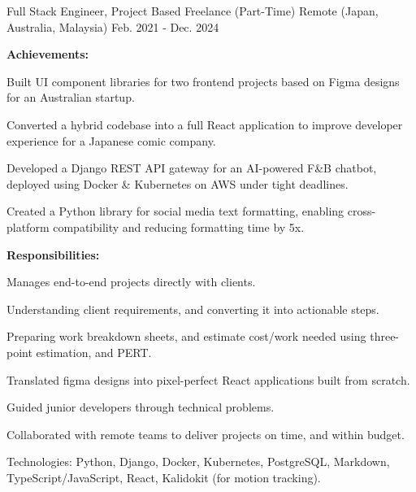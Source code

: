 

\begin{cventries}


  \cventry
    {Full Stack Engineer, Project Based} %
    {Freelance (Part-Time)} %
    {Remote (Japan, Australia, Malaysia)} %
    {Feb. 2021 - Dec. 2024} %
    {
      \textbf{Achievements:}
      \vspace{1.5em}
      \begin{cvitems} %
        \item {Built UI component libraries for two frontend projects based on Figma designs for an Australian startup.}
        \item {Converted a hybrid codebase into a full React application to improve developer experience for a Japanese comic company.}
        \item {Developed a Django REST API gateway for an AI-powered F\&B chatbot, deployed using Docker \& Kubernetes on AWS under tight deadlines.}
        \item {Created a Python library for social media text formatting, enabling cross-platform compatibility and reducing formatting time by 5x.}
      \end{cvitems}
      \vspace{1.5em}
      \textbf{Responsibilities:}
      \vspace{1.5em}
      \begin{cvitems} %
        \item {Manages end-to-end projects directly with clients.}
        \item {Understanding client requirements, and converting it into actionable steps.}
        \item {Preparing work breakdown sheets, and estimate cost/work needed using three-point estimation, and PERT.}
        \item {Translated figma designs into pixel-perfect React applications built from scratch.}
        \item {Guided junior developers through technical problems.}
        \item {Collaborated with remote teams to deliver projects on time, and within budget.}
        \item {Technologies: Python, Django, Docker, Kubernetes, PostgreSQL, Markdown, TypeScript/JavaScript, React, Kalidokit (for motion tracking).}
      \end{cvitems}
    }


\end{cventries}
